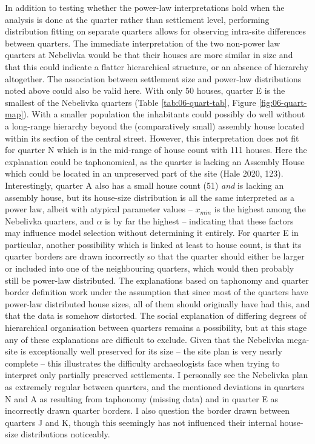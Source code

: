 \documentclass[
  12pt,
  a4paper, twoside]{book}
\begin{document}
In addition to testing whether the power-law interpretations hold when the analysis is done at the quarter rather than settlement level, performing distribution fitting on separate quarters allows for observing intra-site differences between quarters. The immediate interpretation of the two non-power law quarters at Nebelivka would be that their houses are more similar in size and that this could indicate a flatter hierarchical structure, or an absence of hierarchy altogether. The association between settlement size and power-law distributions noted above could also be valid here. With only 50 houses, quarter E is the smallest of the Nebelivka quarters (Table \ref{tab:06-quart-tab}, Figure \ref{fig:06-quart-map}). With a smaller population the inhabitants could possibly do well without a long-range hierarchy beyond the (comparatively small) assembly house located within its section of the central street. However, this interpretation does not fit for quarter N which is in the mid-range of house count with 111 houses. Here the explanation could be taphonomical, as the quarter is lacking an Assembly House which could be located in an unpreserved part of the site (Hale 2020, 123). Interestingly, quarter A also has a small house count (51) \emph{and} is lacking an assembly house, but its house-size distribution is all the same interpreted as a power law, albeit with atypical parameter values -- \(x_{min}\) is the highest among the Nebelivka quarters, and \(\alpha\) is by far the highest -- indicating that these factors may influence model selection without determining it entirely. For quarter E in particular, another possibility which is linked at least to house count, is that its quarter borders are drawn incorrectly so that the quarter should either be larger or included into one of the neighbouring quarters, which would then probably still be power-law distributed. The explanations based on taphonomy and quarter border definition work under the assumption that since most of the quarters have power-law distributed house sizes, all of them should originally have had this, and that the data is somehow distorted. The social explanation of differing degrees of hierarchical organisation between quarters remains a possibility, but at this stage any of these explanations are difficult to exclude. Given that the Nebelivka mega-site is exceptionally well preserved for its size -- the site plan is very nearly complete -- this illustrates the difficulty archaeologists face when trying to interpret only partially preserved settlements. I personally see the Nebelivka plan as extremely regular between quarters, and the mentioned deviations in quarters N and A as resulting from taphonomy (missing data) and in quarter E as incorrectly drawn quarter borders. I also question the border drawn between quarters J and K, though this seemingly has not influenced their internal house-size distributions noticeably.
\end{document}
